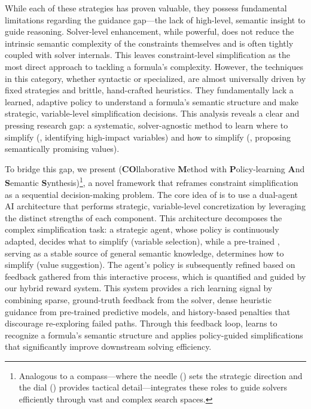 While each of these strategies has proven valuable, they possess fundamental limitations regarding the guidance gap---the lack of high-level, semantic insight to guide reasoning.
Solver-level enhancement, while powerful, does not reduce the intrinsic semantic complexity of the constraints themselves and is often tightly coupled with solver internals. This leaves constraint-level simplification as the most direct approach to tackling a formula's complexity. However, the techniques in this category, whether syntactic or specialized, are almost universally driven by fixed strategies and brittle, hand-crafted heuristics. They fundamentally lack a learned, adaptive policy to understand a formula's semantic structure and make strategic, variable-level simplification decisions.
This analysis reveals a clear and pressing research gap: a systematic, solver-agnostic method to learn where to simplify (\ie, identifying high-impact variables) and how to simplify (\ie, proposing semantically promising values).

To bridge this gap, we present \tool (\textbf{CO}llaborative \textbf{M}ethod with \textbf{P}olicy-learning \textbf{A}nd \textbf{S}emantic \textbf{S}ynthesis)\footnote{Analogous to a compass—where the needle (\RL{}) sets the strategic direction and the dial (\LLM{}) provides tactical detail—\tool integrates these roles to guide \SMT{} solvers efficiently through vast and complex search spaces.}, a novel framework that reframes constraint simplification as a sequential decision-making problem. The core idea of \tool is to use a dual-agent AI architecture that performs strategic, variable-level concretization by leveraging the distinct strengths of each component. This architecture decomposes the complex simplification task: a strategic \RL{} agent, whose policy is continuously adapted, decides what to simplify (variable selection), while a pre-trained \LLM{}, serving as a stable source of general semantic knowledge, determines how to simplify (value suggestion).
The \RL{} agent's policy is subsequently refined based on feedback gathered from this interactive process, which is quantified and guided by our hybrid reward system. This system provides a rich learning signal by combining sparse, ground-truth feedback from the \SMT{} solver, dense heuristic guidance from pre-trained predictive models, and history-based penalties that discourage re-exploring failed paths. Through this feedback loop, \tool learns to recognize a formula's semantic structure and applies policy-guided simplifications that significantly improve downstream solving efficiency.

